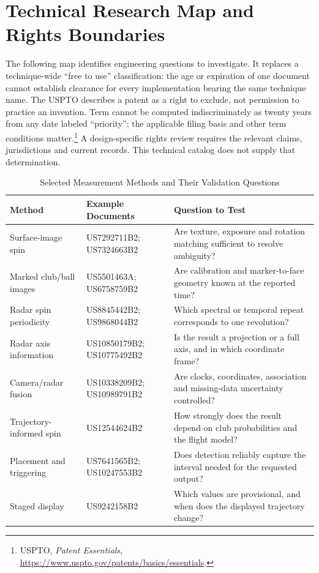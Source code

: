 \section{Technical Research Map and Rights Boundaries}
\label{sec:fto}

The following map identifies engineering questions to investigate.
It replaces a technique-wide ``free to use'' classification: the age or expiration of one document cannot establish clearance for every implementation bearing the same technique name.
The USPTO describes a patent as a right to exclude, not permission to practice an invention.
Term cannot be computed indiscriminately as twenty years from any date labeled ``priority''; the applicable filing basis and other term conditions matter.\footnote{USPTO, \emph{Patent Essentials}, \url{https://www.uspto.gov/patents/basics/essentials}.} A design-specific rights review requires the relevant claims, jurisdictions and current records.
This technical catalog does not supply that determination.

\begin{table}[htbp]
\centering\small
\caption{Selected Measurement Methods and Their Validation Questions}
\label{tab:fto}
\begin{tabular}{@{}>{\raggedright\arraybackslash}p{3.5cm}>{\raggedright\arraybackslash}p{4.1cm}>{\raggedright\arraybackslash}p{6.6cm}@{}}
\toprule
\textbf{Method} & \textbf{Example Documents} & \textbf{Question to Test} \\
\midrule
Surface-image spin & US7292711B2; US7324663B2 &
  Are texture, exposure and rotation matching sufficient to resolve ambiguity? \\
Marked club/ball images & US5501463A; US6758759B2 &
  Are calibration and marker-to-face geometry known at the reported time? \\
Radar spin periodicity & US8845442B2; US9868044B2 &
  Which spectral or temporal repeat corresponds to one revolution? \\
Radar axis information & US10850179B2; US10775492B2 &
  Is the result a projection or a full axis, and in which coordinate frame? \\
Camera/radar fusion & US10338209B2; US10989791B2 &
  Are clocks, coordinates, association and missing-data uncertainty controlled? \\
Trajectory-informed spin & US12544624B2 &
  How strongly does the result depend on club probabilities and the flight model? \\
Placement and triggering & US7641565B2; US10247553B2 &
  Does detection reliably capture the interval needed for the requested output? \\
Staged display & US9242158B2 &
  Which values are provisional, and when does the displayed trajectory change? \\
\bottomrule
\end{tabular}
\end{table}

